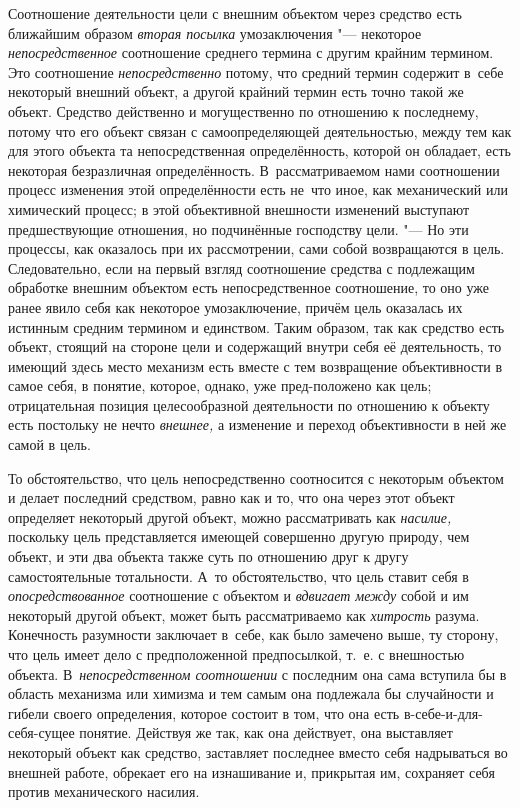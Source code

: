 Соотношение деятельности цели с внешним объектом через
средство есть ближайшим образом {\em вторая посылка}
умозаключения "--- некоторое {\em непосредственное}
соотношение среднего термина с другим крайним термином. Это
соотношение {\em непосредственно}
потому, что средний термин содержит в~себе некоторый внешний
объект, а другой крайний термин есть точно такой же объект. Средство
действенно и могущественно по отношению к последнему, потому что его объект
связан с самоопределяющей деятельностью, между тем как для этого объекта та
непосредственная определённость, которой он обладает, есть некоторая
безразличная определённость. В~рассматриваемом нами соотношении процесс
изменения этой определённости есть не~что иное, как механический или
химический процесс; в этой объективной внешности изменений выступают
предшествующие отношения, но подчинённые господству цели. "---
Но эти процессы, как оказалось при их рассмотрении, сами
собой возвращаются в цель. Следовательно, если на первый взгляд соотношение
средства с подлежащим обработке внешним объектом есть непосредственное
соотношение, то оно уже ранее явило себя как некоторое умозаключение,
причём цель оказалась их истинным средним термином и единством. Таким
образом, так как средство есть объект, стоящий на стороне цели и содержащий
внутри себя её деятельность, то имеющий здесь место механизм есть вместе с
тем возвращение объективности в самое себя, в понятие, которое, однако, уже
пред-положено как цель; отрицательная позиция целесообразной деятельности
по отношению к объекту есть постольку не нечто
{\em внешнее,} а
изменение и переход объективности в ней же самой в цель.

То обстоятельство, что цель непосредственно соотносится с
некоторым объектом и делает последний средством, равно как и то, что она
через этот объект определяет некоторый другой объект, можно рассматривать
как {\em насилие,}
поскольку цель представляется имеющей совершенно другую
природу, чем объект, и эти два объекта также суть по отношению друг к другу
самостоятельные тотальности. А~то обстоятельство, что цель ставит себя в
{\em опосредствованное}
соотношение с объектом и
{\em вдвигает между}
собой и им некоторый другой объект, может быть рассматриваемо
как {\em хитрость}
разума. Конечность разумности заключает в~себе, как было
замечено выше, ту сторону, что цель имеет дело с
предположенной предпосылкой, т.~е. с внешностью объекта.
В~{\em непосредственном соотношении}
с последним она сама вступила бы в область механизма или
химизма и тем самым она подлежала бы случайности и гибели своего
определения, которое состоит в том, что она есть в-себе-и-для-себя-сущее
понятие. Действуя же так, как она действует, она выставляет некоторый
объект как средство, заставляет последнее вместо себя надрываться во
внешней работе, обрекает его на изнашивание и, прикрытая им, сохраняет себя
против механического насилия.

